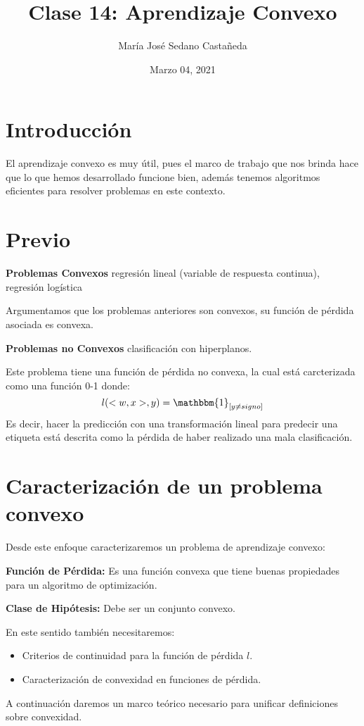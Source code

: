 \documentclass{article}
\title{Clase 14: Aprendizaje Convexo}
\author{María José Sedano Castañeda}
\date{Marzo 04, 2021}
\begin{document}
\maketitle

\section{Introducción}

El aprendizaje convexo es muy útil, pues el marco de trabajo que nos brinda hace que lo que hemos desarrollado funcione bien, además tenemos algoritmos eficientes para resolver problemas en este contexto. 

\section{Previo}
\textbf{Problemas Convexos} regresión lineal (variable de respuesta continua), regresión logística

Argumentamos que los problemas anteriores son convexos, su función de pérdida asociada es convexa.

\textbf{Problemas no Convexos} clasificación con hiperplanos.

Este problema tiene una función de pérdida no convexa, la cual está carcterizada como una función 0-1 donde:
$$l(<w,x>,y)= \mathbbm{1}_{[y\neq signo]}$$ 
Es decir, hacer la predicción con una transformación lineal para predecir una etiqueta está descrita como la pérdida de haber realizado una mala clasificación.
\section{Caracterización de un problema convexo}
Desde este enfoque caracterizaremos un problema de aprendizaje convexo:

\textbf{Función de Pérdida:} Es una función convexa que tiene buenas propiedades para un algoritmo de optimización.

\textbf{Clase de Hipótesis:} Debe ser un conjunto convexo.

En este sentido también necesitaremos:
\begin{itemize}
    \item Criterios de continuidad para la función de pérdida $l$.
    \item Caracterización de convexidad en funciones de pérdida.
\end{itemize}

A continuación daremos un marco teórico necesario para unificar definiciones sobre convexidad. 
\end{document}
